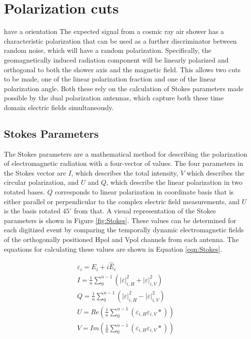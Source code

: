 \section{Polarization cuts}
	have a  orientation The expected signal from a cosmic ray air shower has a characteristic polarization that can be used as a further discriminator between random noise, which will have a random polarization.  Specifically, the geomagnetically induced radiation component will be linearly polarized and orthogonal to both the shower axis and the magnetic field.  This allows two cuts to be made, one of the linear polarization fraction and one of the linear polarization angle.  Both these rely on the calculation of Stokes parameters made possible by the dual polarization antennas, which capture both these time domain electric fields simultaneously.

	\subsection{Stokes Parameters}
		The Stokes parameters are a mathematical method for describing the polarization of electromagnetic radiation with a four-vector of values.  The four parameters in the Stokes vector are $I$, which describes the total intensity, $V$ which describes the circular polarization, and $U$ and $Q$, which describe the linear polarization in two rotated bases.  $Q$ corresponds to linear polarization in coordinate basis that is either parallel or perpendicular to the complex electric field measurements, and $U$ is the basis rotated $45^{\circ}$ from that.  A visual representation of the Stokes parameters is shown in Figure \ref{fig:Stokes}.  These values can be determined for each digitized event by comparing the temporally dynamic electromagnetic fields of the orthogonally positioned Hpol and Vpol channels from each antenna.  The equations for calculating these values are shown in Equation \ref{eqn:Stokes}.
		
	\begin{gather*}
	\varepsilon_{i} = E_{i} + i\hat{E}_{i} \\
	I =	\frac{1}{n}\sum^{n-1}_{0}(|\varepsilon|^{2}_{i,H} + |\varepsilon|^{2}_{i,V}) \\
	Q =	\frac{1}{n}\sum^{n-1}_{0}(|\varepsilon|^{2}_{i,H} - |\varepsilon|^{2}_{i,V}) \\
	U =	Re(\frac{1}{n}\sum^{n-1}_{0}(\varepsilon_{i,H} \varepsilon_{i,V}*)) \\
	V =	Im(\frac{1}{n}\sum^{n-1}_{0}(\varepsilon_{i,H} \varepsilon_{i,V}*)) \\
	\label{eqn:Stokes}
	\end{gather*}

